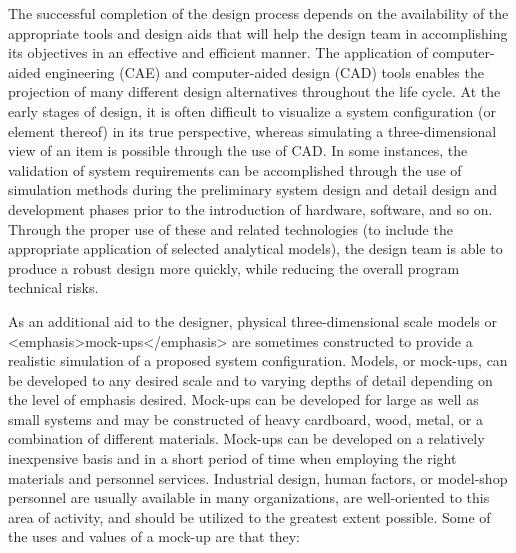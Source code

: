 The successful completion of the design process depends on the availability of the appropriate tools and design aids that will help the design team in accomplishing its objectives in an effective and efficient manner. The application of computer-aided engineering (CAE) and computer-aided design (CAD) tools enables the projection of many different design alternatives throughout the life cycle. At the early stages of design, it is often difficult to visualize a system configuration (or element thereof) in its true perspective, whereas simulating a three-dimensional view of an item is possible through the use of CAD. In some instances, the validation of system requirements can be accomplished through the use of simulation methods during the preliminary system design and detail design and development phases prior to the introduction of hardware, software, and so on. Through the proper use of these and related technologies (to include the appropriate application of selected analytical models), the design team is able to produce a robust design more quickly, while reducing the overall program technical risks.

As an additional aid to the designer, physical three-dimensional scale models or <emphasis>mock-ups</emphasis> are sometimes constructed to provide a realistic simulation of a proposed system configuration. Models, or mock-ups, can be developed to any desired scale and to varying depths of detail depending on the level of emphasis desired. Mock-ups can be developed for large as well as small systems and may be constructed of heavy cardboard, wood, metal, or a combination of different materials. Mock-ups can be developed on a relatively inexpensive basis and in a short period of time when employing the right materials and personnel services. Industrial design, human factors, or model-shop personnel are usually available in many organizations, are well-oriented to this area of activity, and should be utilized to the greatest extent possible. Some of the uses and values of a mock-up are that they:

